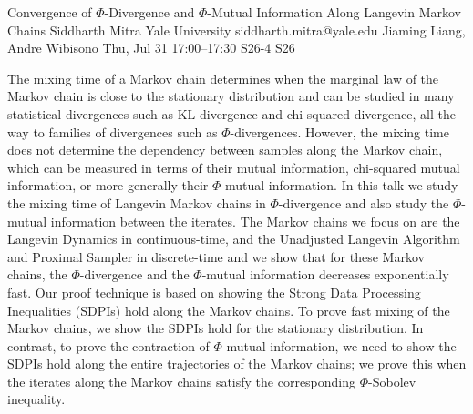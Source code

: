 \begin{talk}
  {Convergence of $\Phi$-Divergence and $\Phi$-Mutual Information Along Langevin Markov Chains}%
  {Siddharth Mitra}%
  {Yale University}%
  {siddharth.mitra@yale.edu}%
  {Jiaming Liang, Andre Wibisono}%
  {}%
  {Thu, Jul 31 17:00–17:30}%
  {S26-4}%
  {S26}%
  
				
			
The mixing time of a Markov chain determines when the marginal law of the Markov chain is close to the stationary distribution and can be studied in many statistical divergences such as KL divergence and chi-squared divergence, all the way to families of divergences such as $\Phi$-divergences. However, the mixing time does not determine the dependency between samples along the Markov chain, which can be measured in terms of their mutual information, chi-squared mutual information, or more generally their $\Phi$-mutual information. In this talk we study the mixing time of Langevin Markov chains in $\Phi$-divergence and also study the $\Phi$-mutual information between the iterates. The Markov chains we focus on are the Langevin Dynamics in continuous-time, and the Unadjusted Langevin Algorithm and Proximal Sampler in discrete-time and we show that for these Markov chains, the $\Phi$-divergence and the $\Phi$-mutual information decreases exponentially fast. Our proof technique is based on showing the Strong Data Processing Inequalities (SDPIs) hold along the Markov chains. To prove fast mixing of the Markov chains, we show the SDPIs hold for the stationary distribution. In contrast, to prove the contraction of $\Phi$-mutual information, we need to show the SDPIs hold along the entire trajectories of the Markov chains; we prove this when the iterates along the Markov chains satisfy the corresponding $\Phi$-Sobolev inequality.


\medskip


\end{talk}

